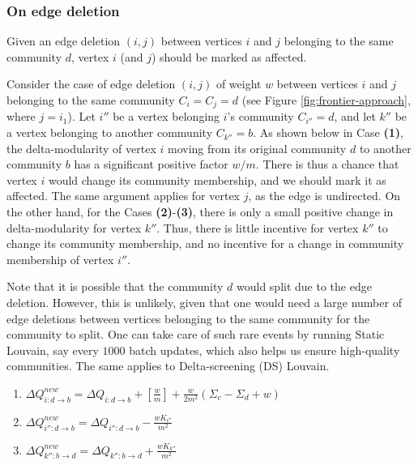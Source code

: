 




\subsubsection{On edge deletion}

\begin{lemma}
\label{thm:louvain--mark-deletion}
Given an edge deletion $(i, j)$ between vertices $i$ and $j$ belonging to the same community $d$, vertex $i$ (and $j$) should be marked as affected.
\end{lemma}

Consider the case of edge deletion $(i, j)$ of weight $w$ between vertices $i$ and $j$ belonging to the same community $C_i = C_j = d$ (see Figure \ref{fig:frontier-approach}, where $j = i_1$). Let $i''$ be a vertex belonging $i$'s community $C_{i''} = d$, and let $k''$ be a vertex belonging to another community $C_{k''} = b$. As shown below in Case \textbf{(1)}, the delta-modularity of vertex $i$ moving from its original community $d$ to another community $b$ has a significant positive factor $w/m$. There is thus a chance that vertex $i$ would change its community membership, and we should mark it as affected. The same argument applies for vertex $j$, as the edge is undirected. On the other hand, for the Cases \textbf{(2)}-\textbf{(3)}, there is only a small positive change in delta-modularity for vertex $k''$. Thus, there is little incentive for vertex $k''$ to change its community membership, and no incentive for a change in community membership of vertex $i''$.

Note that it is possible that the community $d$ would split due to the edge deletion. However, this is unlikely, given that one would need a large number of edge deletions between vertices belonging to the same community for the community to split. One can take care of such rare events by running Static Louvain, say every $1000$ batch updates, which also helps us ensure high-quality communities. The same applies to Delta-screening (DS) Louvain.

\begin{enumerate}
  \item $\Delta Q_{i:d \rightarrow b}^{new} = \Delta Q_{i:d \rightarrow b} + [\frac{w}{m}] + \frac{w}{2m^2} (\Sigma_c - \Sigma_d + w)$
  \item $\Delta Q_{i'':d \rightarrow b}^{new} = \Delta Q_{i'':d \rightarrow b} - \frac{wK_{i''}}{m^2}$
  \item $\Delta Q_{k'':b \rightarrow d}^{new} = \Delta Q_{k'':b \rightarrow d} + \frac{wK_{k''}}{m^2}$
\end{enumerate}

